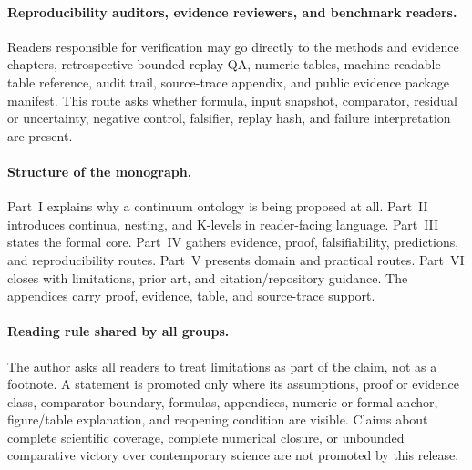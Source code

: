 \paragraph{Reproducibility auditors, evidence reviewers, and benchmark readers.}
Readers responsible for verification may go directly to the methods and
evidence chapters, retrospective bounded replay QA, numeric tables, machine-readable
table reference, audit trail, source-trace appendix, and public evidence
package manifest. This route asks whether formula, input snapshot, comparator,
residual or uncertainty, negative control, falsifier, replay hash, and failure
interpretation are present.

\paragraph{Structure of the monograph.}
Part~I explains why a continuum ontology is being proposed at all. Part~II
introduces continua, nesting, and K-levels in reader-facing language. Part~III
states the formal core. Part~IV gathers evidence, proof, falsifiability,
predictions, and reproducibility routes. Part~V presents domain and practical
routes. Part~VI closes with limitations, prior art, and citation/repository
guidance. The appendices carry proof, evidence, table, and source-trace support.

\paragraph{Reading rule shared by all groups.}
The author asks all readers to treat limitations as part of the claim, not as a
footnote. A statement is promoted only where its assumptions, proof or evidence
class, comparator boundary, formulas, appendices, numeric or formal anchor,
figure/table explanation, and reopening condition are visible. Claims about
complete scientific coverage, complete numerical closure, or unbounded
comparative victory over contemporary science are not promoted by this release.

\clearpage
